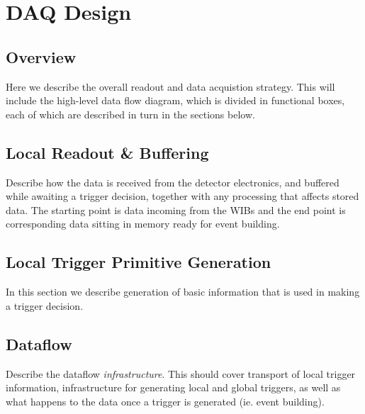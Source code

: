 
\section{DAQ Design}
\label{sec:fdsp-daq-design}



\subsection{Overview}
\label{sec:fdsp-daq-ltr}

Here we describe the overall readout and data acquistion strategy. This will include the high-level data flow diagram, which is divided in functional boxes, each of which are described in turn in the sections below.

\subsection{Local Readout \& Buffering}
\label{sec:fdsp-daq-ltr}

Describe how the data is received from the detector electronics, and buffered while awaiting a trigger decision, together with any processing that affects stored data.  The starting point is data incoming from the WIBs and the end point is corresponding data sitting in memory ready for event building. 

\subsection{Local Trigger Primitive Generation}
\label{sec:fdsp-daq-ltr}

In this section we describe generation of basic information that is used in making a trigger decision.

\subsection{Dataflow}
\label{sec:fdsp-daq-hlt}

Describe the dataflow {\it infrastructure}. This should cover transport of local trigger information, infrastructure for generating local and global triggers, as well as what happens to the data once a trigger is generated (ie. event building). 

